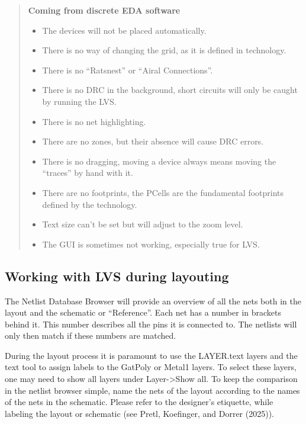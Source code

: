 \documentclass[
  letterpaper,
]{scrbook}
\begin{document}
\begin{tcolorbox}
\begin{quote}
\textbf{Coming from discrete EDA software}

\begin{itemize}
\item
  The devices will not be placed automatically.
\item
  There is no way of changing the grid, as it is defined in technology.
\item
  There is no ``Ratsnest'' or ``Airal Connections''.
\item
  There is no DRC in the background, short circuits will only be caught
  by running the LVS.
\item
  There is no net highlighting.
\item
  There are no zones, but their absence will cause DRC errors.
\item
  There is no dragging, moving a device always means moving the
  ``traces'' by hand with it.
\item
  There are no footprints, the PCells are the fundamental footprints
  defined by the technology.
\item
  Text size can't be set but will adjust to the zoom level.
\item
  The GUI is sometimes not working, especially true for LVS.
\end{itemize}
\end{quote}

\end{tcolorbox}

\subsection{Working with LVS during
layouting}\label{working-with-lvs-during-layouting}

The Netlist Database Browser will provide an overview of all the nets
both in the layout and the schematic or ``Reference''. Each net has a
number in brackets behind it. This number describes all the pins it is
connected to. The netlists will only then match if these numbers are
matched.

During the layout process it is paramount to use the LAYER.text layers
and the text tool to assign labels to the GatPoly or Metal1 layers. To
select these layers, one may need to show all layers under
Layer-\textgreater Show all. To keep the comparison in the netlist
browser simple, name the nets of the layout according to the names of
the nets in the schematic. Please refer to the designer's etiquette,
while labeling the layout or schematic (see Pretl, Koefinger, and Dorrer
(2025)).
\end{document}
